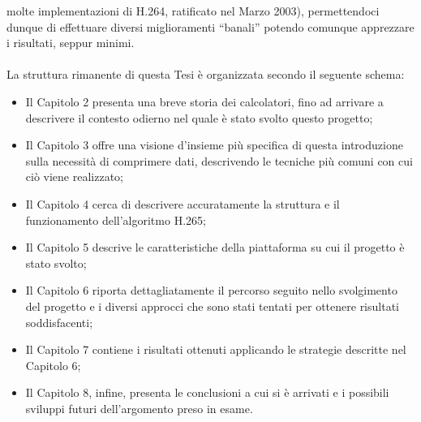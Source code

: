 molte implementazioni di H.264, ratificato nel Marzo 2003), permettendoci
dunque di effettuare diversi miglioramenti ``banali'' potendo comunque
apprezzare i risultati, seppur minimi.
\\ \\
La struttura rimanente di questa Tesi è organizzata secondo il seguente schema:
\begin{itemize}
\item Il Capitolo 2 presenta una breve storia dei calcolatori, fino ad arrivare
      a descrivere il contesto odierno nel quale è stato svolto questo progetto;
\item Il Capitolo 3 offre una visione d'insieme più specifica di questa 
      introduzione sulla necessità di comprimere dati, descrivendo le tecniche
      più comuni con cui ciò viene realizzato;
\item Il Capitolo 4 cerca di descrivere accuratamente la struttura e il
      funzionamento dell'algoritmo H.265;
\item Il Capitolo 5 descrive le caratteristiche della piattaforma su cui il
      progetto è stato svolto;
\item Il Capitolo 6 riporta dettagliatamente il percorso seguito nello 
      svolgimento del progetto e i diversi approcci che sono stati tentati per
      ottenere risultati soddisfacenti;
\item Il Capitolo 7 contiene i risultati ottenuti applicando le strategie
      descritte nel Capitolo 6;
\item Il Capitolo 8, infine, presenta le conclusioni a cui si è arrivati e i
      possibili sviluppi futuri dell'argomento preso in esame.
\end{itemize}